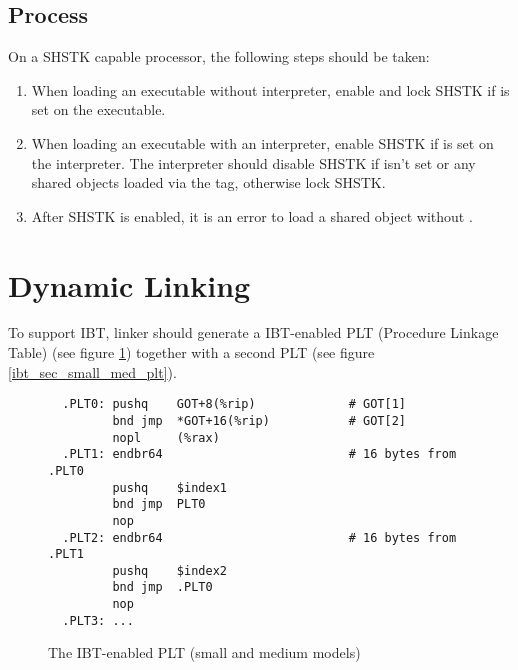 \subsection{Process }
\label{shstk}

On a SHSTK capable processor, the following steps should be taken:

\begin{enumerate}
  \item
    \begin{sloppypar}
      When loading an executable without interpreter, enable and lock
      SHSTK if  is set on the
      executable.
   \end{sloppypar}
  \item
    \begin{sloppypar}
      When loading an executable with an interpreter, enable SHSTK if
       is set on the interpreter.
      The interpreter should disable SHSTK if
       isn't set or any shared
      objects loaded via the  tag, otherwise lock SHSTK.
   \end{sloppypar}
  \item After SHSTK is enabled, it is an error to load a shared object
    without .
\end{enumerate}

\section{Dynamic Linking}

To support IBT, linker should generate a IBT-enabled PLT (Procedure
Linkage Table) (see figure \ref{ibt_small_med_plt}) together with a second
PLT (see figure \ref{ibt_sec_small_med_plt}).

\begin{figure}[H]
\Hrule
\caption{The IBT-enabled PLT (small and medium models)}
\label{ibt_small_med_plt}
\begin{footnotesize}
\begin{verbatim}
  .PLT0: pushq    GOT+8(%rip)             # GOT[1]
         bnd jmp  *GOT+16(%rip)           # GOT[2]
         nopl     (%rax)
  .PLT1: endbr64                          # 16 bytes from .PLT0
         pushq    $index1
         bnd jmp  PLT0
         nop
  .PLT2: endbr64                          # 16 bytes from .PLT1
         pushq    $index2
         bnd jmp  .PLT0
         nop
  .PLT3: ...
\end{verbatim}%
\end{footnotesize}
\Hrule
\end{figure}

